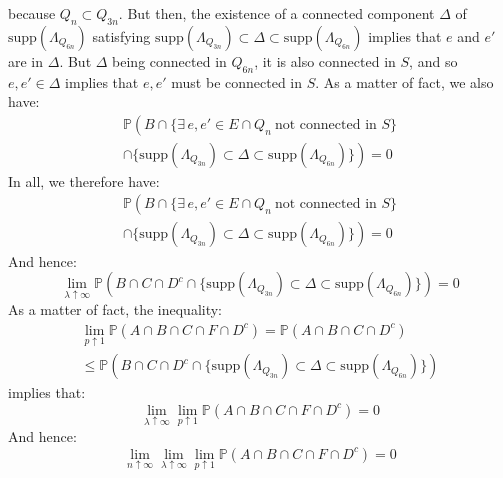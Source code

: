 \documentclass[10pt,a4paper]{amsart}
\theoremstyle{exampstyle}
\theoremstyle{exampnotations}
\begin{document}
because $Q_n \subset Q_{3n}$. But then, the existence of a connected component $\Delta$ of $\text{supp}(\Lambda_{Q_{6n}})$ satisfying $\text{supp}(\Lambda_{Q_{3n}}) \subset \Delta \subset \text{supp}(\Lambda_{Q_{6n}})$ implies that $e$ and $e'$ are in $\Delta$. But $\Delta$ being connected in $Q_{6n}$, it is also connected in $S$, and so $e,e' \in \Delta$ implies that $e,e'$ must be connected in $S$. As a matter of fact, we also have:
\begin{gather*}
    \mathbb{P}\left(B  \cap \Big\lbrace \exists \, e,e' \in E\cap Q_n \: \text{not connected in } S  \Big\rbrace \right. \\ \left. \cap \Big\lbrace \text{supp}(\Lambda_{Q_{3n}}) \subset \Delta \subset \text{supp}(\Lambda_{Q_{6n}}) \Big\rbrace  \right) = 0
\end{gather*}
In all, we therefore have:
\begin{gather*}
    \mathbb{P}\left(B  \cap \Big\lbrace \exists \, e,e' \in E\cap Q_n \: \text{not connected in } S  \Big\rbrace \right. \\ \left. \cap \Big\lbrace \text{supp}(\Lambda_{Q_{3n}}) \subset \Delta \subset \text{supp}(\Lambda_{Q_{6n}}) \Big\rbrace  \right) = 0
\end{gather*}
And hence:
\begin{equation*}
   \lim_{\lambda \uparrow \infty} \mathbb{P}\left(B \cap C \cap D^c  \cap \Big\lbrace \text{supp}(\Lambda_{Q_{3n}}) \subset \Delta \subset \text{supp}(\Lambda_{Q_{6n}}) \Big\rbrace \right) = 0 
\end{equation*}
As a matter of fact, the inequality:
\begin{gather*}
    \lim_{p \uparrow 1} \mathbb{P}(A \cap B \cap C \cap F \cap D^{c})  = \mathbb{P}(A \cap B \cap C \cap D^c)  \\ \leq \mathbb{P}\left(B \cap C \cap D^c  \cap \Big\lbrace \text{supp}(\Lambda_{Q_{3n}}) \subset \Delta \subset \text{supp}(\Lambda_{Q_{6n}}) \Big\rbrace \right)
\end{gather*}
implies that:
\begin{equation*}
     \lim_{\lambda \uparrow \infty}\lim_{p \uparrow 1} \mathbb{P}(A \cap B \cap C \cap F \cap D^{c}) = 0
\end{equation*}
And hence:
\begin{equation}
    \label{eq21}
    \lim_{n \uparrow \infty}\lim_{\lambda \uparrow \infty}\lim_{p \uparrow 1} \mathbb{P}(A \cap B \cap C \cap F \cap D^{c}) = 0
\end{equation}
\end{document}
